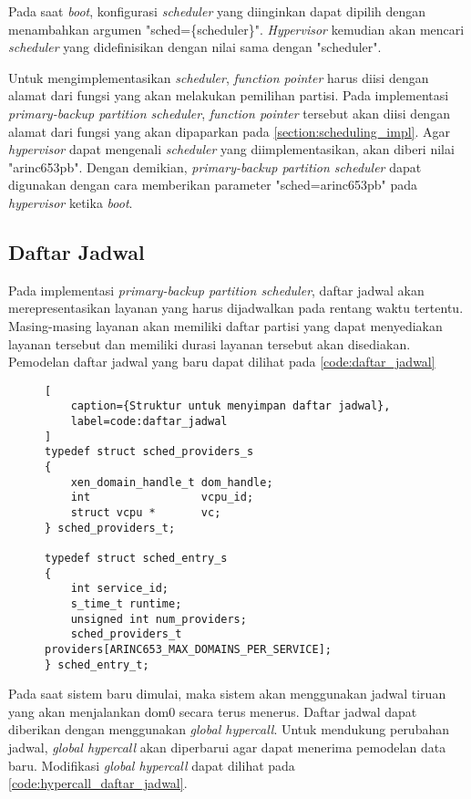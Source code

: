 Pada saat \textit{boot}, konfigurasi \textit{scheduler} yang diinginkan dapat dipilih dengan
menambahkan argumen "sched=\{scheduler\}". \textit{Hypervisor} kemudian akan mencari
\textit{scheduler} yang didefinisikan dengan nilai  sama dengan "scheduler".

Untuk mengimplementasikan \textit{scheduler}, \textit{function pointer} 
harus diisi dengan alamat dari fungsi yang akan melakukan pemilihan partisi. Pada implementasi
\textit{primary-backup partition scheduler}, \textit{function pointer} tersebut akan diisi
dengan alamat dari fungsi  yang akan dipaparkan pada
\autoref{section:scheduling_impl}. Agar \textit{hypervisor} dapat mengenali \textit{scheduler}
yang diimplementasikan,  akan diberi nilai "arinc653pb". Dengan demikian,
\textit{primary-backup partition scheduler} dapat digunakan dengan cara memberikan parameter
"sched=arinc653pb" pada \textit{hypervisor} ketika \textit{boot}.

\subsection{Daftar Jadwal}

Pada implementasi \textit{primary-backup partition scheduler}, daftar jadwal akan
merepresentasikan layanan yang harus dijadwalkan pada rentang waktu tertentu. Masing-masing
layanan akan memiliki daftar partisi yang dapat menyediakan layanan tersebut dan memiliki durasi
layanan tersebut akan disediakan. Pemodelan daftar jadwal yang baru dapat dilihat pada
\autoref{code:daftar_jadwal}

\begin{figure}[!ht]
\begin{lstlisting}[
	caption={Struktur untuk menyimpan daftar jadwal},
	label=code:daftar_jadwal
]
typedef struct sched_providers_s
{
    xen_domain_handle_t dom_handle;
    int                 vcpu_id;
    struct vcpu *       vc;
} sched_providers_t;

typedef struct sched_entry_s
{
    int service_id;
    s_time_t runtime;
    unsigned int num_providers;
    sched_providers_t providers[ARINC653_MAX_DOMAINS_PER_SERVICE];
} sched_entry_t;
\end{lstlisting}
\end{figure}


Pada saat sistem baru dimulai, maka sistem akan menggunakan jadwal tiruan yang akan menjalankan
dom0 secara terus menerus. Daftar jadwal dapat diberikan dengan menggunakan \textit{global
hypercall}.  Untuk mendukung perubahan jadwal, \textit{global hypercall} akan diperbarui agar
dapat menerima pemodelan data baru. Modifikasi \textit{global hypercall} dapat dilihat pada
\autoref{code:hypercall_daftar_jadwal}.

